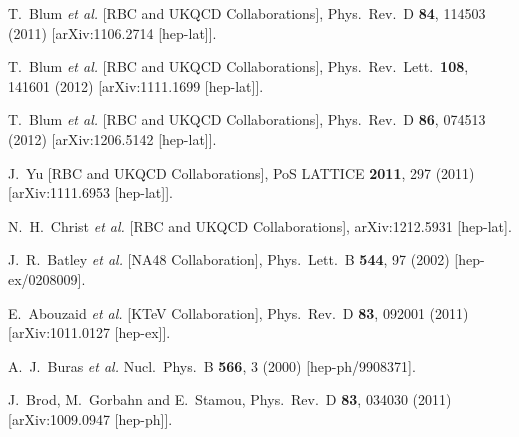 \begin{thebibliography}{99}
  T.~Blum {\it et al.} [RBC and UKQCD Collaborations],
  Phys.\ Rev.\ D {\bf 84}, 114503 (2011)
  [arXiv:1106.2714 [hep-lat]]. 
  
  T.~Blum {\it et al.} [RBC and UKQCD Collaborations],
  Phys.\ Rev.\ Lett.\  {\bf 108}, 141601 (2012)
  [arXiv:1111.1699 [hep-lat]].

  T.~Blum {\it et al.} [RBC and UKQCD Collaborations],
  Phys.\ Rev.\ D {\bf 86}, 074513 (2012)
  [arXiv:1206.5142 [hep-lat]].

  J.~Yu [RBC and UKQCD Collaborations],
  PoS LATTICE {\bf 2011}, 297 (2011)
  [arXiv:1111.6953 [hep-lat]].

  N.~H.~Christ {\it et al.} [RBC and UKQCD Collaborations],
  arXiv:1212.5931 [hep-lat].
  
  J.~R.~Batley {\it et al.}  [NA48 Collaboration],
  Phys.\ Lett.\ B {\bf 544}, 97 (2002)
  [hep-ex/0208009].
 
  E.~Abouzaid {\it et al.}  [KTeV Collaboration],
  Phys.\ Rev.\ D {\bf 83}, 092001 (2011)
  [arXiv:1011.0127 [hep-ex]].
  
  A.~J.~Buras {\it et al.}
  Nucl.\ Phys.\ B {\bf 566}, 3 (2000)
  [hep-ph/9908371].
  
  J.~Brod, M.~Gorbahn and E.~Stamou,
  Phys.\ Rev.\ D {\bf 83}, 034030 (2011)
  [arXiv:1009.0947 [hep-ph]].
  

\end{thebibliography}
